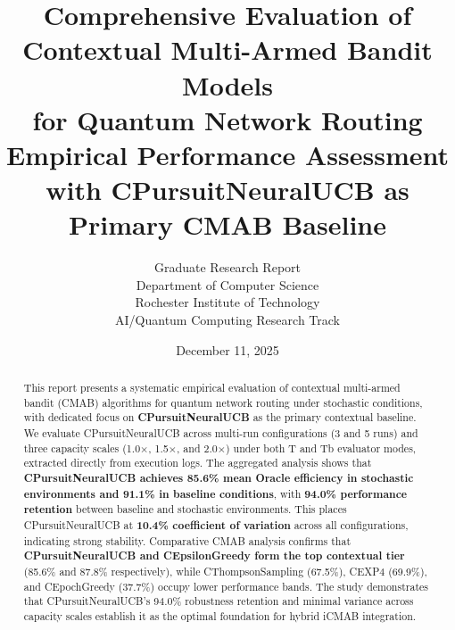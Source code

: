 \documentclass[12pt,a4paper]{article}
\title{\textbf{Comprehensive Evaluation of Contextual Multi-Armed Bandit Models\\for Quantum Network Routing}\\
\large{Empirical Performance Assessment with CPursuitNeuralUCB as Primary CMAB Baseline}}
\author{Graduate Research Report\\
Department of Computer Science\\
Rochester Institute of Technology\\
AI/Quantum Computing Research Track}
\date{December 11, 2025}
\newcommand{\primarytext}[1]{\textcolor{primaryblue}{\textbf{#1}}}
\newcommand{\success}[1]{\textcolor{accentgreen}{\textbf{#1}}}
\begin{document}
\maketitle

\begin{abstract}
This report presents a systematic empirical evaluation of contextual multi-armed bandit (CMAB) algorithms for quantum network routing under stochastic conditions, with dedicated focus on \primarytext{CPursuitNeuralUCB} as the primary contextual baseline. We evaluate CPursuitNeuralUCB across multi-run configurations (3 and 5 runs) and three capacity scales (1.0$\times$, 1.5$\times$, and 2.0$\times$) under both T and Tb evaluator modes, extracted directly from execution logs. The aggregated analysis shows that \primarytext{CPursuitNeuralUCB achieves 85.6\% mean Oracle efficiency in stochastic environments and 91.1\% in baseline conditions}, with \success{94.0\% performance retention} between baseline and stochastic environments. This places CPursuitNeuralUCB at \primarytext{10.4\% coefficient of variation} across all configurations, indicating strong stability. Comparative CMAB analysis confirms that \success{CPursuitNeuralUCB and CEpsilonGreedy form the top contextual tier} (85.6\% and 87.8\% respectively), while CThompsonSampling (67.5\%), CEXP4 (69.9\%), and CEpochGreedy (37.7\%) occupy lower performance bands. The study demonstrates that CPursuitNeuralUCB's 94.0\% robustness retention and minimal variance across capacity scales establish it as the optimal foundation for hybrid iCMAB integration.
\end{abstract}

\newpage
\vspace{0.5cm}
\tableofcontents

\newpage
\end{document}
